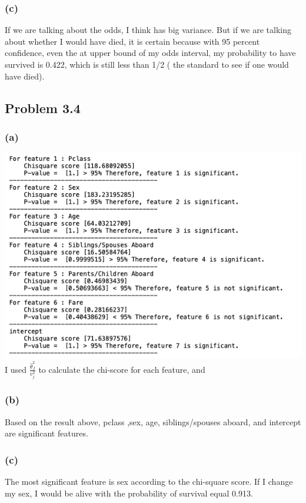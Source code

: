 \documentclass{article}
\begin{document}
\subsubsection*{(c)}
	If we are talking about the odds, I think has big variance. But if we are talking about whether I would have died, it is certain because with 95 percent confidence, even the at upper bound of my odds interval, my probability to have survived is 0.422, which  is still  less than 1/2 ( the standard to see if one would have died).
	
\subsection*{Problem 3.4}
\subsubsection*{(a)}
	
	\includegraphics[scale=0.5]{test_v2}
	I used $\frac{\hat{\theta}^{2}_{J}}{v_j^{2}}$ to calculate the chi-score for each feature, and
	
\subsubsection*{(b)}
	Based on the result above, pclass ,sex, age, siblings/spouses aboard, and intercept are significant features.
	
\subsubsection*{(c)}
	The most significant feature is sex according to the chi-square score. If I change my sex, I would be alive with the probability of survival  equal 0.913.	

\end{document}
